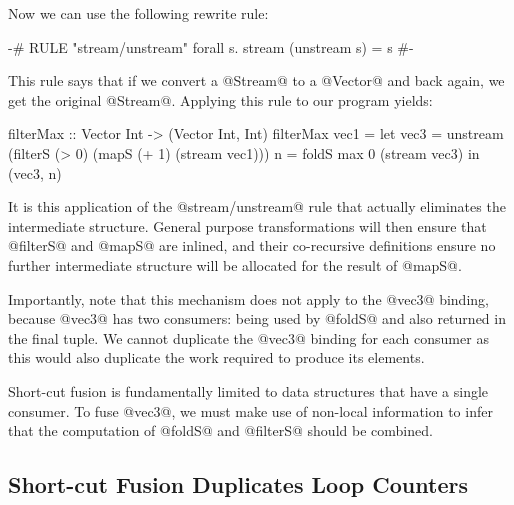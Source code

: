 %
Now we can use the following rewrite rule:
%
\begin{code}
 {-# RULE "stream/unstream" 
          forall s. stream (unstream s) = s #-}
\end{code}
%
This rule says that if we convert a @Stream@ to a @Vector@ and back again, we get the original @Stream@. Applying this rule to our program yields:
%
\begin{code}
filterMax :: Vector Int -> (Vector Int, Int)
filterMax vec1
 = let vec3 = unstream (filterS (> 0) 
                        (mapS (+ 1) (stream vec1)))
       n    = foldS max 0 (stream vec3)
   in  (vec3, n)
\end{code}
%
It is this application of the @stream/unstream@ rule that actually eliminates the intermediate structure. General purpose transformations will then ensure that @filterS@ and @mapS@ are inlined, and their co-recursive definitions ensure no further intermediate structure will be allocated for the result of @mapS@. 

Importantly, note that this mechanism does not apply to the @vec3@ binding, because @vec3@ has two consumers: being used by @foldS@ and also returned in the final tuple. We cannot duplicate the @vec3@ binding for each consumer as this would also duplicate the work required to produce its elements. 

Short-cut fusion is fundamentally limited to data structures that have a single consumer. To fuse @vec3@, we must make use of non-local information to infer that the computation of @foldS@ and @filterS@ should be combined.


\subsection{Short-cut Fusion Duplicates Loop Counters}
\label{s:streams-zipWith}

